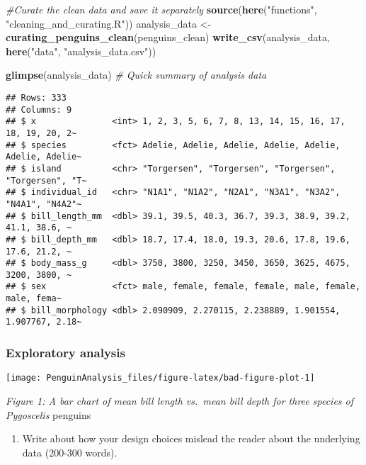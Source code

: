 \documentclass[
]{article}
\newenvironment{Shaded}{\begin{snugshade}}{\end{snugshade}}
\newcommand{\CommentTok}[1]{\textcolor[rgb]{0.56,0.35,0.01}{\textit{#1}}}
\newcommand{\FunctionTok}[1]{\textcolor[rgb]{0.13,0.29,0.53}{\textbf{#1}}}
\newcommand{\NormalTok}[1]{#1}
\newcommand{\OtherTok}[1]{\textcolor[rgb]{0.56,0.35,0.01}{#1}}
\newcommand{\StringTok}[1]{\textcolor[rgb]{0.31,0.60,0.02}{#1}}
\providecommand{\tightlist}{%
  \setlength{\itemsep}{0pt}\setlength{\parskip}{0pt}}
\begin{document}
\begin{Shaded}
\begin{Highlighting}[]
\CommentTok{\#Curate the clean data and save it separately}
\FunctionTok{source}\NormalTok{(}\FunctionTok{here}\NormalTok{(}\StringTok{"functions"}\NormalTok{, }\StringTok{"cleaning\_and\_curating.R"}\NormalTok{))}
\NormalTok{analysis\_data }\OtherTok{\textless{}{-}} \FunctionTok{curating\_penguins\_clean}\NormalTok{(penguins\_clean)}
\FunctionTok{write\_csv}\NormalTok{(analysis\_data, }\FunctionTok{here}\NormalTok{(}\StringTok{"data"}\NormalTok{, }\StringTok{"analysis\_data.csv"}\NormalTok{))}

\FunctionTok{glimpse}\NormalTok{(analysis\_data) }\CommentTok{\# Quick summary of analysis data}
\end{Highlighting}
\end{Shaded}

\begin{verbatim}
## Rows: 333
## Columns: 9
## $ x               <int> 1, 2, 3, 5, 6, 7, 8, 13, 14, 15, 16, 17, 18, 19, 20, 2~
## $ species         <fct> Adelie, Adelie, Adelie, Adelie, Adelie, Adelie, Adelie~
## $ island          <chr> "Torgersen", "Torgersen", "Torgersen", "Torgersen", "T~
## $ individual_id   <chr> "N1A1", "N1A2", "N2A1", "N3A1", "N3A2", "N4A1", "N4A2"~
## $ bill_length_mm  <dbl> 39.1, 39.5, 40.3, 36.7, 39.3, 38.9, 39.2, 41.1, 38.6, ~
## $ bill_depth_mm   <dbl> 18.7, 17.4, 18.0, 19.3, 20.6, 17.8, 19.6, 17.6, 21.2, ~
## $ body_mass_g     <dbl> 3750, 3800, 3250, 3450, 3650, 3625, 4675, 3200, 3800, ~
## $ sex             <fct> male, female, female, female, male, female, male, fema~
## $ bill_morphology <dbl> 2.090909, 2.270115, 2.238889, 1.901554, 1.907767, 2.18~
\end{verbatim}

\subsubsection{Exploratory analysis}\label{exploratory-analysis}

\begin{center}\texttt{[image: PenguinAnalysis\_files/figure-latex/bad-figure-plot-1]} \end{center}

\emph{Figure 1: A bar chart of mean bill length vs.~mean bill depth for
three species of Pygoscelis} penguins

\begin{enumerate}
\def\labelenumi{\alph{enumi})}
\setcounter{enumi}{1}
\tightlist
\item
  Write about how your design choices mislead the reader about the
  underlying data (200-300 words).
\end{enumerate}
\end{document}
